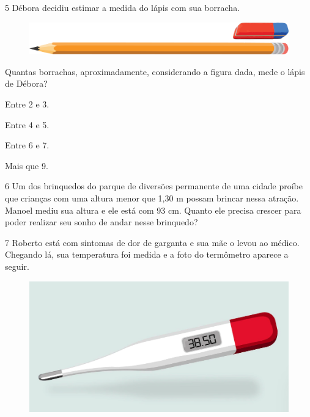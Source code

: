 
\num{5} Débora decidiu estimar a medida do lápis com sua borracha.

\begin{figure}[htpb!]
\centering
\includegraphics[width=.5\textwidth]{./media/image46.png}
\end{figure}

Quantas borrachas, aproximadamente, considerando a figura dada, mede o lápis de Débora?

\begin{minipage}{.5\textwidth}
\begin{escolha}
\item
  Entre 2 e 3.
\item
  Entre 4 e 5.
\item
  Entre 6 e 7.
\item
  Mais que 9.
\end{escolha}
\end{minipage}

\num{6} Um dos brinquedos do parque de diversões permanente de uma cidade proíbe
que crianças com uma altura menor que 1,30 m possam brincar nessa
atração. Manoel mediu sua altura e ele está com 93 cm. Quanto ele
precisa crescer para poder realizar seu sonho de andar nesse brinquedo?




\num{7} Roberto está com sintomas de dor de garganta e sua mãe o levou ao
médico. Chegando lá, sua temperatura foi medida e a foto do termômetro
aparece a seguir.

\begin{figure}[htpb!]
\centering
\includegraphics[width=.5\textwidth]{./media/image47.png}
\end{figure}

